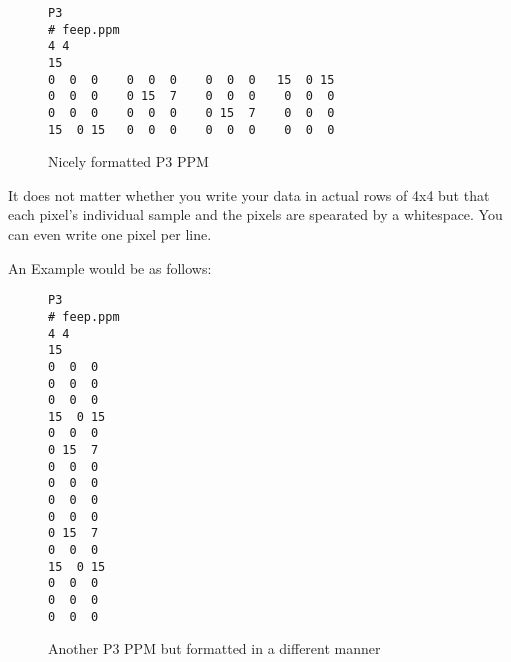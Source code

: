 \documentclass{article}
\begin{document}
\begin{figure}[H]
\centering
\begin{lstlisting}
P3
# feep.ppm
4 4
15
0  0  0    0  0  0    0  0  0   15  0 15
0  0  0    0 15  7    0  0  0    0  0  0
0  0  0    0  0  0    0 15  7    0  0  0
15  0 15   0  0  0    0  0  0    0  0  0
\end{lstlisting}
\caption[short]{Nicely formatted P3 PPM}
\end{figure}

It does not matter whether you write your data in actual rows of 4x4
but that each pixel's individual sample and the pixels are spearated
by a whitespace\footnotemark[1]. You can even write one pixel per line.

An Example would be as follows:

\begin{figure}[H]
    \centering
\begin{lstlisting}
P3
# feep.ppm
4 4
15
0  0  0
0  0  0 
0  0  0 
15  0 15
0  0  0 
0 15  7 
0  0  0 
0  0  0
0  0  0 
0  0  0 
0 15  7 
0  0  0
15  0 15
0  0  0 
0  0  0 
0  0  0
\end{lstlisting}
\caption[short]{Another P3 PPM but formatted in a different manner}
\end{figure}

\end{document}
